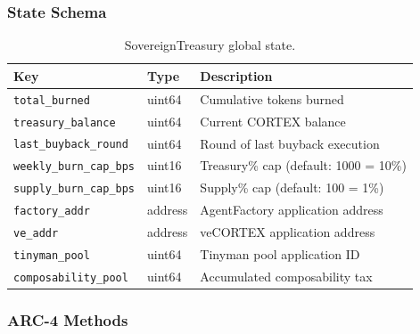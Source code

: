 \subsubsection{State Schema}

\begin{table}[H]
\centering
\caption{SovereignTreasury global state.}
\label{tab:treasury-global}
\begin{tabular}{@{}llp{6cm}@{}}
\toprule
\textbf{Key} & \textbf{Type} & \textbf{Description} \\
\midrule
\texttt{total\_burned} & uint64 & Cumulative tokens burned \\
\texttt{treasury\_balance} & uint64 & Current CORTEX balance \\
\texttt{last\_buyback\_round} & uint64 & Round of last buyback execution \\
\texttt{weekly\_burn\_cap\_bps} & uint16 & Treasury\% cap (default: 1000 = 10\%) \\
\texttt{supply\_burn\_cap\_bps} & uint16 & Supply\% cap (default: 100 = 1\%) \\
\texttt{factory\_addr} & address & AgentFactory application address \\
\texttt{ve\_addr} & address & veCORTEX application address \\
\texttt{tinyman\_pool} & uint64 & Tinyman pool application ID \\
\texttt{composability\_pool} & uint64 & Accumulated composability tax \\
\bottomrule
\end{tabular}
\end{table}

\subsubsection{ARC-4 Methods}


